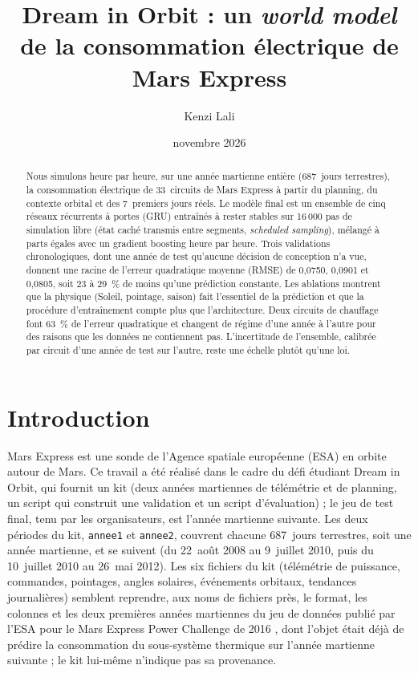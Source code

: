 \documentclass[11pt,a4paper]{article}
\title{Dream in Orbit : un \emph{world model} de la consommation électrique de Mars Express}
\author{Kenzi Lali}
\date{novembre 2026}
\begin{document}
\maketitle

\begin{abstract}
Nous simulons heure par heure, sur une année martienne entière (687~jours terrestres), la consommation électrique de 33~circuits de Mars Express à partir du planning, du contexte orbital et des 7~premiers jours réels. Le modèle final est un ensemble de cinq réseaux récurrents à portes (GRU) entraînés à rester stables sur 16\,000 pas de simulation libre (état caché transmis entre segments, \emph{scheduled sampling}), mélangé à parts égales avec un gradient boosting heure par heure. Trois validations chronologiques, dont une année de test qu'aucune décision de conception n'a vue, donnent une racine de l'erreur quadratique moyenne (RMSE) de 0,0750, 0,0901 et 0,0805, soit 23 à 29~\% de moins qu'une prédiction constante. Les ablations montrent que la physique (Soleil, pointage, saison) fait l'essentiel de la prédiction et que la procédure d'entraînement compte plus que l'architecture. Deux circuits de chauffage font 63~\% de l'erreur quadratique et changent de régime d'une année à l'autre pour des raisons que les données ne contiennent pas. L'incertitude de l'ensemble, calibrée par circuit d'une année de test sur l'autre, reste une échelle plutôt qu'une loi.
\end{abstract}

\section{Introduction}\label{sec:intro}

Mars Express est une sonde de l'Agence spatiale européenne (ESA) en orbite autour de Mars. Ce travail a été réalisé dans le cadre du défi étudiant Dream in Orbit, qui fournit un kit (deux années martiennes de télémétrie et de planning, un script qui construit une validation et un script d'évaluation) ; le jeu de test final, tenu par les organisateurs, est l'année martienne suivante. Les deux périodes du kit, \texttt{annee1} et \texttt{annee2}, couvrent chacune 687~jours terrestres, soit une année martienne, et se suivent (du 22~août 2008 au 9~juillet 2010, puis du 10~juillet 2010 au 26~mai 2012). Les six fichiers du kit (télémétrie de puissance, commandes, pointages, angles solaires, événements orbitaux, tendances journalières) semblent reprendre, aux noms de fichiers près, le format, les colonnes et les deux premières années martiennes du jeu de données publié par l'ESA pour le Mars Express Power Challenge de 2016 \citep{esa2016kelvins,lucas2017mars}, dont l'objet était déjà de prédire la consommation du sous-système thermique sur l'année martienne suivante \citep{petkovic2019machine} ; le kit lui-même n'indique pas sa provenance.
\end{document}

